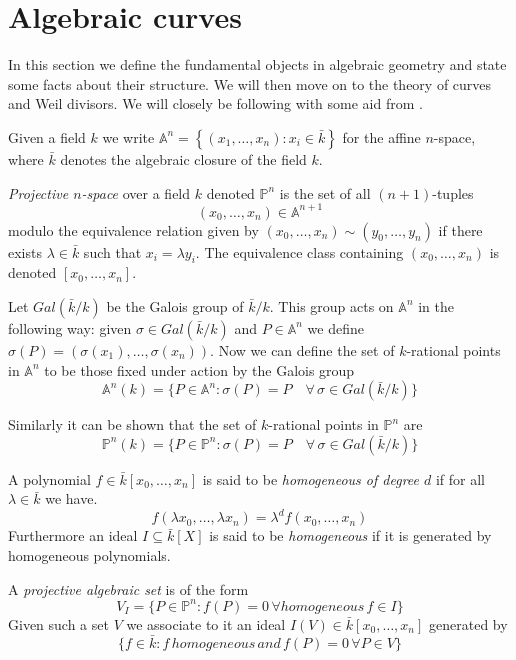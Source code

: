 
\section{Algebraic curves}
In this section we define the fundamental objects in algebraic geometry and state
some facts about their structure. We will then move on to the theory of
curves and Weil divisors. We will closely be following \cite{AEC} with some aid from
\cite{Fulton}.

Given a field $k$ we write $\mathbb{A}^n = \left\{ (x_1,\ldots,x_n) : x_i\in \bar{k}\right\}$ for the
affine $n$-space, where $\bar{k}$ denotes the algebraic closure of the field $k$.

\begin{mydef}
\emph{Projective $n$-space} over a field $k$ denoted $\mathbb{P}^n$ is the set 
of all $(n+1)$-tuples $$(x_0,\ldots,x_n)\in\mathbb{A}^{n+1}$$
modulo the equivalence relation given by $(x_0,\ldots,x_n)\sim(y_0,\ldots,y_n)$ 
if there exists $\lambda\in \bar{k}$ such that $x_i=\lambda y_i$.
The equivalence class containing $(x_0, \ldots, x_n)$ is denoted $[x_0,\ldots,x_n]$.
\end{mydef}

Let $Gal(\bar{k}/k)$ be the Galois group of $\bar{k}/k$. This group acts on
$\mathbb{A}^n$ in the following way: given $\sigma \in Gal(\bar{k}/k)$ and $P\in \mathbb{A}^n$
we define $\sigma(P) = (\sigma(x_1),\ldots,\sigma(x_n))$. Now we can define
the set of $k$-rational points in $\mathbb{A}^n$ to be those fixed under action by
the Galois group
$$ \mathbb{A}^n(k) = \{ P \in \mathbb{A}^n : \sigma(P) = P\quad \forall\, \sigma \in
Gal(\bar{k}/k) \} $$

Similarly it can be shown that the set of $k$-rational points in $\mathbb{P}^n$ are
$$ \mathbb{P}^n(k) = \{ P \in \mathbb{P}^n : \sigma(P) = P\quad \forall\, \sigma \in 
Gal(\bar{k}/k) \} $$

\begin{mydef}
 A polynomial $f\in\bar{k}[x_0,\ldots,x_n]$ is said to be \emph{homogeneous of degree $d$} if for all
$\lambda\in\bar{k}$ we have.
$$f(\lambda x_0,\ldots,\lambda x_n) = \lambda^d f(x_0,\ldots,x_n)$$
Furthermore an ideal $I\subseteq\bar{k}[X]$ is said to be \emph{homogeneous} if it is generated
by homogeneous polynomials.
\end{mydef}

\begin{mydef}
 A \emph{projective algebraic set} is of the form
$$ V_I = \{ P\in \mathbb{P}^n : f(P) = 0\, \forall homogeneous\, f\in I \} $$
Given such a set $V$ we associate to it an ideal $I(V) \in \bar{k}[x_0,\ldots, x_n]$ generated by
$$ \{f\in\bar{k} : f\, homogeneous\, and\, f(P)=0\, \forall P\in V \} $$
\end{mydef}

